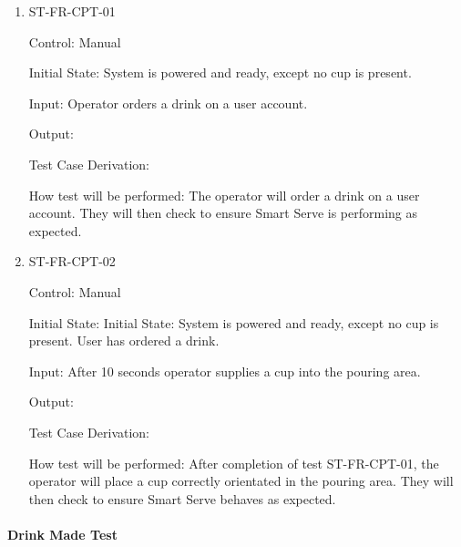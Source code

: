 \documentclass[12pt, titlepage]{article}
\begin{document}
\begin{enumerate}

\item{ST-FR-CPT-01\\}

Control: Manual
					
Initial State: System is powered and ready, except no cup is present.
					
Input: Operator orders a drink on a user account. 
					
Output: %

Test Case Derivation: 
					
How test will be performed: The operator will order a drink on a user account. They will then check to ensure Smart Serve is performing as expected.

\item{ST-FR-CPT-02\\}

Control: Manual

Initial State: Initial State: System is powered and ready, except no cup is present. User has ordered a drink.

Input: After 10 seconds operator supplies a cup into the pouring area.

Output: 

Test Case Derivation: 

How test will be performed: After completion of test ST-FR-CPT-01, the operator will place a cup correctly orientated in the pouring area. They will then check to ensure Smart Serve behaves as expected.

\end{enumerate}

\paragraph{Drink Made Test}
\end{document}
